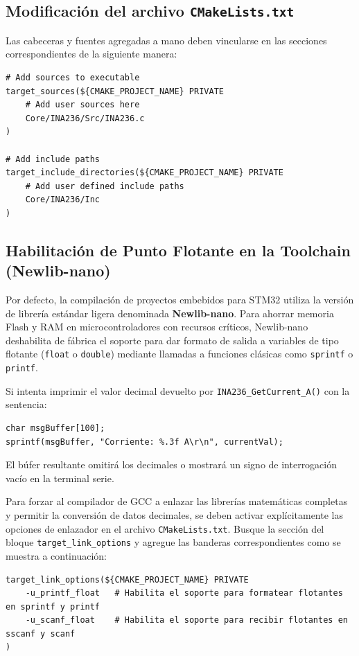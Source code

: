 \documentclass[
10pt, %
a4paper, %
oneside, %
headinclude,footinclude, %
BCOR5mm, %
]{scrartcl}
\begin{document}
\subsection{Modificación del archivo \texttt{CMakeLists.txt}}
Las cabeceras y fuentes agregadas a mano deben vincularse en las secciones correspondientes de la siguiente manera:
\begin{lstlisting}[style=CMakeStyle]
# Add sources to executable
target_sources(${CMAKE_PROJECT_NAME} PRIVATE
    # Add user sources here
    Core/INA236/Src/INA236.c
)

# Add include paths
target_include_directories(${CMAKE_PROJECT_NAME} PRIVATE
    # Add user defined include paths
    Core/INA236/Inc
)
\end{lstlisting}

\subsection{Habilitación de Punto Flotante en la Toolchain (Newlib-nano)}
Por defecto, la compilación de proyectos embebidos para STM32 utiliza la versión de librería estándar ligera denominada \textbf{Newlib-nano}. Para ahorrar memoria Flash y RAM en microcontroladores con recursos críticos, Newlib-nano deshabilita de fábrica el soporte para dar formato de salida a variables de tipo flotante (\texttt{float} o \texttt{double}) mediante llamadas a funciones clásicas como \texttt{sprintf} o \texttt{printf}.

Si intenta imprimir el valor decimal devuelto por \texttt{INA236\_GetCurrent\_A()} con la sentencia:
\begin{lstlisting}[style=CMakeStyle]
char msgBuffer[100];
sprintf(msgBuffer, "Corriente: %.3f A\r\n", currentVal);
\end{lstlisting}
El búfer resultante omitirá los decimales o mostrará un signo de interrogación vacío en la terminal serie.

Para forzar al compilador de GCC a enlazar las librerías matemáticas completas y permitir la conversión de datos decimales, se deben activar explícitamente las opciones de enlazador en el archivo \texttt{CMakeLists.txt}. Busque la sección del bloque \texttt{target\_link\_options} y agregue las banderas correspondientes como se muestra a continuación:

\begin{lstlisting}[style=CMakeStyle]
target_link_options(${CMAKE_PROJECT_NAME} PRIVATE
    -u_printf_float   # Habilita el soporte para formatear flotantes en sprintf y printf
    -u_scanf_float    # Habilita el soporte para recibir flotantes en sscanf y scanf
)
\end{lstlisting}
\end{document}
